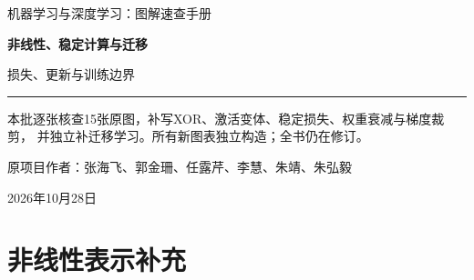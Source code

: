 \documentclass[a4paper,11pt,oneside,openany]{book}
\begin{document}
\frontmatter
\hypersetup{pageanchor=false}
\begin{titlepage}
\vspace*{16mm}
{\sffamily\color{Teal}\large 机器学习与深度学习：图解速查手册\par}
\vspace{15mm}
{\sffamily\bfseries\color{Ink}\Huge 非线性、稳定计算与迁移\par}
\vspace{6mm}
{\sffamily\color{Ink}\LARGE 损失、更新与训练边界\par}
\vspace{12mm}
\noindent\textcolor{Teal}{\rule{\textwidth}{1.2pt}}
\vspace{7mm}
\begin{keyidea}[第十三批阶段样章]
本批逐张核查15张原图，补写XOR、激活变体、稳定损失、权重衰减与梯度裁剪，
并独立补迁移学习。所有新图表独立构造；全书仍在修订。
\end{keyidea}
\vfill
原项目作者：张海飞、郭金珊、任露芹、李慧、朱靖、朱弘毅\par
\vspace{4mm}
2026年10月28日\par
\end{titlepage}
\hypersetup{pageanchor=true}
\tableofcontents
\mainmatter
\setcounter{chapter}{9}
\chapter{非线性表示补充}



\end{document}
